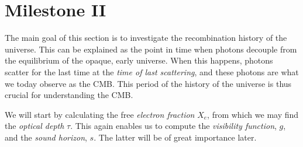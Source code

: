 \section{Milestone II}\label{sec:m2}

The main goal of this section is to investigate the recombination history of the universe. This can be explained as the point in time when photons decouple from the equilibrium of the opaque, early universe.  When this happens, photons scatter for the last time at the \textit{time of last scattering}, and these photons are what we today observe as the CMB. This period of the history of the universe is thus crucial for understanding the CMB. 

We will start by calculating the free \textit{electron fraction} $X_e$, from which we may find the \textit{optical depth} $\tau$. This again enables us to compute the \textit{visibility function}, $g$, and the \textit{sound horizon}, $s$. The latter will be of great importance later. 






